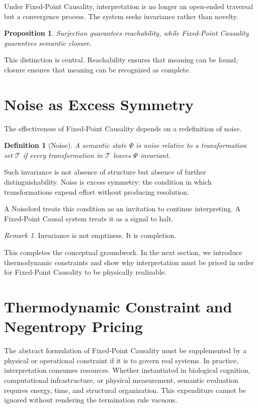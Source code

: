 \documentclass[12pt]{article}
\newtheorem{definition}[theorem]{Definition}
\newtheorem{proposition}[theorem]{Proposition}
\theoremstyle{remark}
\newtheorem*{remark}{Remark}
\begin{document}
Under Fixed-Point Causality, interpretation is no longer an open-ended traversal but a convergence process. The system seeks invariance rather than novelty.

\begin{proposition}
Surjection guarantees reachability, while Fixed-Point Causality guarantees semantic closure.
\end{proposition}

This distinction is central. Reachability ensures that meaning can be found; closure ensures that meaning can be recognized as complete.

\section{Noise as Excess Symmetry}

The effectiveness of Fixed-Point Causality depends on a redefinition of noise.

\begin{definition}[Noise]
A semantic state $\Psi$ is noise relative to a transformation set $\mathcal{T}$ if every transformation in $\mathcal{T}$ leaves $\Psi$ invariant.
\end{definition}

Such invariance is not absence of structure but absence of further distinguishability. Noise is excess symmetry: the condition in which transformations expend effort without producing resolution.

A Noiselord treats this condition as an invitation to continue interpreting. A Fixed-Point Causal system treats it as a signal to halt.

\begin{remark}
Invariance is not emptiness. It is completion.
\end{remark}

This completes the conceptual groundwork. In the next section, we introduce thermodynamic constraints and show why interpretation must be priced in order for Fixed-Point Causality to be physically realizable.

\section{Thermodynamic Constraint and Negentropy Pricing}

The abstract formulation of Fixed-Point Causality must be supplemented by a physical or operational constraint if it is to govern real systems. In practice, interpretation consumes resources. Whether instantiated in biological cognition, computational infrastructure, or physical measurement, semantic evaluation requires energy, time, and structural organization. This expenditure cannot be ignored without rendering the termination rule vacuous.
\end{document}
